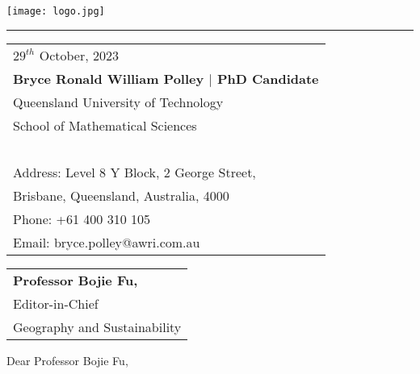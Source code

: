 \documentclass{article}
\begin{document}

\texttt{[image: logo.jpg]} %

\vspace{-1em} %

\rule{\linewidth}{1pt} %

\bigskip\bigskip %


\hfill
\begin{tabular}{l @{}}
	$29^{th}$ October, 2023\\ %
	\textbf{Bryce Ronald William Polley $|$ PhD Candidate}\\
	Queensland University of Technology \\
	School of Mathematical Sciences\\~\\
	Address: Level 8 Y Block, 2 George Street, \\
	Brisbane, Queensland, Australia, 4000\\
	Phone: +61 400 310 105 \\
	Email: bryce.polley@awri.com.au
\end{tabular}

\bigskip %


\begin{tabular}{@{} l}
	\textbf{Professor Bojie Fu,}\\
	Editor-in-Chief \\
	Geography and Sustainability\\
\end{tabular}

\bigskip %

Dear Professor Bojie Fu,
\\~\\
\parskip %
\end{document}
